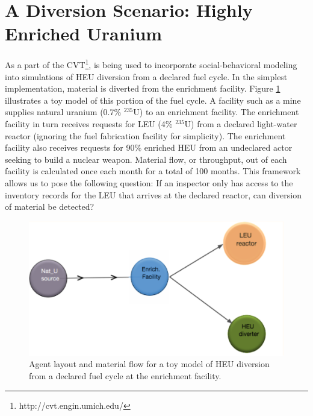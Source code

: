 \section{A Diversion Scenario: Highly Enriched Uranium}
\label{s_results}
As a part of the \gls{CVT}\footnote{http://cvt.engin.umich.edu/}, \Cyclus is being used to incorporate social-behavioral modeling into simulations of \gls{HEU} diversion from a declared fuel cycle.  In the simplest implementation, material is diverted from the enrichment facility.  Figure \ref{fig:heu_layout} illustrates a toy model of this portion of the fuel cycle. A facility such as a mine supplies natural uranium (0.7\% $^{235}$U) to an enrichment facility.  The enrichment facility in turn receives requests for  \gls{LEU} (4\% $^{235}$U) from a declared light-water reactor (ignoring the fuel fabrication facility for simplicity).  The enrichment facility also receives requests for 90\% enriched \gls{HEU} from an undeclared actor seeking to build a nuclear weapon. Material flow, or throughput, out of each facility is calculated once each month for a total of 100 months.  This framework allows us to pose the following question: If an inspector only has access to the inventory records for the \gls{LEU} that arrives at the declared reactor, can diversion of material be detected?

\begin{figure}%
\begin{center}
\includegraphics[natwidth=162bp,natheight=227bp, scale=0.7]{./figs/heu_cyclist_layout.png}
\end{center}
\caption{Agent layout and material flow for a toy model of \gls{HEU} diversion from a declared fuel cycle at the enrichment facility.}
\label{fig:heu_layout}
\end{figure}

